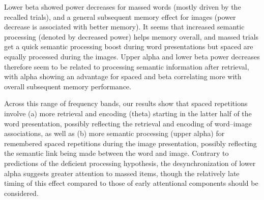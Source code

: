 Lower beta showed power decreases for massed words (mostly driven by the recalled trials), and a general subsequent memory effect for images (power decrease is associated with better memory).  It seems that increased semantic processing (denoted by decreased power) helps memory overall, and massed trials get a quick semantic processing boost during word presentations but spaced are equally processed during the images.  Upper alpha and lower beta power decreases therefore seem to be related to processing semantic information after retrieval, with alpha showing an advantage for spaced and beta correlating more with overall subsequent memory performance.

Across this range of frequency bands, our results show that spaced repetitions involve (a) more retrieval and encoding (theta) starting in the latter half of the word presentation, possibly reflecting the retrieval and encoding of word--image associations, as well as (b) more semantic processing (upper alpha) for remembered spaced repetitions during the image presentation, possibly reflecting the semantic link being made between the word and image.
Contrary to predictions of the deficient processing hypothesis, the desynchronization of lower alpha suggests greater attention to massed items, though the relatively late timing of this effect compared to those of early attentional components should be considered.






